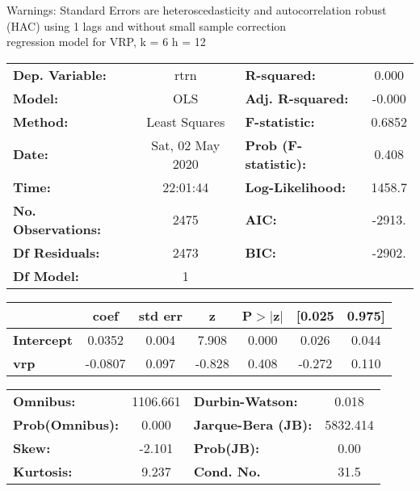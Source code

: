 Warnings: \newline
 [1] Standard Errors are heteroscedasticity and autocorrelation robust (HAC) using 1 lags and without small sample correction\\ 

regression model for VRP, k = 6 h = 12\begin{center}
\begin{tabular}{lclc}
\toprule
\textbf{Dep. Variable:}    &       rtrn       & \textbf{  R-squared:         } &     0.000   \\
\textbf{Model:}            &       OLS        & \textbf{  Adj. R-squared:    } &    -0.000   \\
\textbf{Method:}           &  Least Squares   & \textbf{  F-statistic:       } &    0.6852   \\
\textbf{Date:}             & Sat, 02 May 2020 & \textbf{  Prob (F-statistic):} &    0.408    \\
\textbf{Time:}             &     22:01:44     & \textbf{  Log-Likelihood:    } &    1458.7   \\
\textbf{No. Observations:} &        2475      & \textbf{  AIC:               } &    -2913.   \\
\textbf{Df Residuals:}     &        2473      & \textbf{  BIC:               } &    -2902.   \\
\textbf{Df Model:}         &           1      & \textbf{                     } &             \\
\bottomrule
\end{tabular}
\begin{tabular}{lcccccc}
                   & \textbf{coef} & \textbf{std err} & \textbf{z} & \textbf{P$> |$z$|$} & \textbf{[0.025} & \textbf{0.975]}  \\
\midrule
\textbf{Intercept} &       0.0352  &        0.004     &     7.908  &         0.000        &        0.026    &        0.044     \\
\textbf{vrp}       &      -0.0807  &        0.097     &    -0.828  &         0.408        &       -0.272    &        0.110     \\
\bottomrule
\end{tabular}
\begin{tabular}{lclc}
\textbf{Omnibus:}       & 1106.661 & \textbf{  Durbin-Watson:     } &    0.018  \\
\textbf{Prob(Omnibus):} &   0.000  & \textbf{  Jarque-Bera (JB):  } & 5832.414  \\
\textbf{Skew:}          &  -2.101  & \textbf{  Prob(JB):          } &     0.00  \\
\textbf{Kurtosis:}      &   9.237  & \textbf{  Cond. No.          } &     31.5  \\
\bottomrule
\end{tabular}
\end{center}

